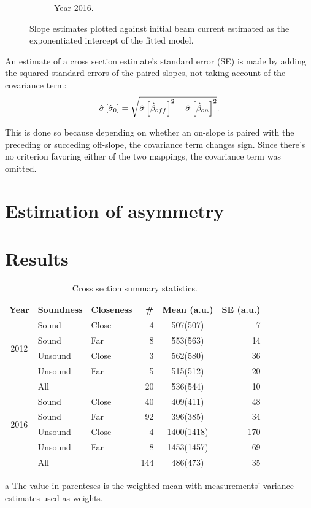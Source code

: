\documentclass[reprint]{revtex4-1}
\begin{document}
\begin{figure}
\begin{subfigure}{.5\textwidth}
\caption{Year 2016.\label{fig:SlpOnI02016}}
\end{subfigure}
\caption{Slope estimates plotted against initial beam current estimated as the exponentiated intercept of the fitted model.}
\end{figure}

An estimate of a cross section estimate's standard error (SE) is made by adding the squared standard errors of the paired slopes, not taking account of the covariance term:
\begin{equation}
	\SE*{\CS*[0]} = \sqrt{\SE*{\slp*[off]}^2 + \SE*{\slp*[on]}^2}.
\end{equation}

This is done so because depending on whether an on-slope is paired with the preceding or succeding off-slope, the covariance term changes sign. Since there's no criterion favoring either of the two mappings, the covariance term was omitted.

\section{Estimation of asymmetry}

\pagebreak

\section{Results}
\begin{table}
\centering
\begin{threeparttable}
\caption{Cross section summary statistics. \label{tbl:CS-all}}
\begin{tabular}{c|llrcr}
\hline\hline
Year						& Soundness		& Closeness		& \#		& Mean\tnote{a} (a.u.)	& SE (a.u.) \\
\hline
\multirow{4}{*}{2012}		& Sound			& Close			& 4			& 507(507)				& 7  \\
							& Sound			& Far			& 8			& 553(563)				& 14 \\
							& Unsound		& Close			& 3			& 562(580)				& 36 \\
							& Unsound		& Far			& 5			& 515(512)				& 20 \\
							& All			& 				& 20		& 536(544)				& 10 \\
\hline					
\multirow{4}{*}{2016}		& Sound			& Close			& 40		& 409(411)				& 48 \\
							& Sound			& Far			& 92		& 396(385)				& 34 \\
							& Unsound		& Close			& 4			& 1400(1418)			& 170\\
							& Unsound		& Far			& 8			& 1453(1457)			& 69 \\
							& All			& 				& 144		& 486(473)				& 35 \\
\hline\hline
\end{tabular}
\begin{tablenotes}
\item[a] The value in parenteses is the weighted mean with measurements' variance estimates used as weights.
\end{tablenotes}
\end{threeparttable}
\end{table}
\end{document}
